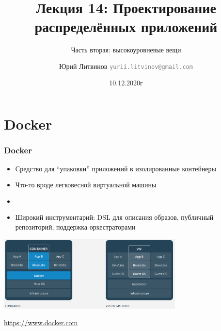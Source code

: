\documentclass[xetex,mathserif,serif]{beamer}
\title{Лекция 14: Проектирование распределённых приложений}
\subtitle{Часть вторая: высокоуровневые вещи}
\author[Юрий Литвинов]{Юрий Литвинов \newline \textcolor{gray}{\small\texttt{yurii.litvinov@gmail.com}}}
\date{10.12.2020г}
\newcommand{\attribution}[1] {
    \begin{flushright}\begin{scriptsize}\textcolor{gray}{\textcopyright\; #1}\end{scriptsize}\end{flushright}
}
\begin{document}
    
    \frame{\titlepage}

    \section{Docker}

    \begin{frame}
        \frametitle{Docker}
        \begin{itemize}
            \item Средство для ``упаковки'' приложений в изолированные контейнеры
            \item Что-то вроде легковесной виртуальной машины
            \item \item Широкий инструментарий: DSL для описания образов, публичный репозиторий, поддержка оркестраторами
        \end{itemize}
        \begin{center}
            \includegraphics[width=0.7\textwidth]{docker.png}
            \attribution{\url{https://www.docker.com}}
        \end{center}
    \end{frame}
\end{document}
